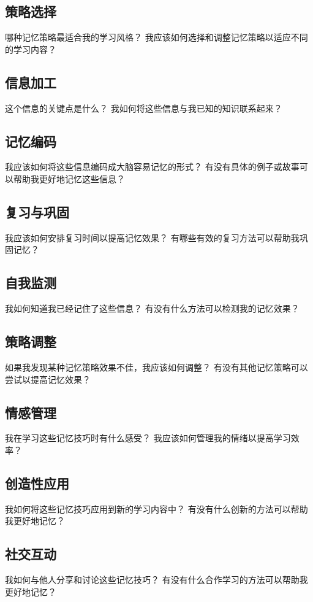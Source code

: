\documentclass[12pt]{book}
\begin{document}
\subsection{策略选择}
哪种记忆策略最适合我的学习风格？
我应该如何选择和调整记忆策略以适应不同的学习内容？

\subsection{信息加工}
这个信息的关键点是什么？
我如何将这些信息与我已知的知识联系起来？

\subsection{记忆编码}
我应该如何将这些信息编码成大脑容易记忆的形式？
有没有具体的例子或故事可以帮助我更好地记忆这些信息？

\subsection{复习与巩固}
我应该如何安排复习时间以提高记忆效果？
有哪些有效的复习方法可以帮助我巩固记忆？

\subsection{自我监测}
我如何知道我已经记住了这些信息？
有没有什么方法可以检测我的记忆效果？

\subsection{策略调整}
如果我发现某种记忆策略效果不佳，我应该如何调整？
有没有其他记忆策略可以尝试以提高记忆效果？

\subsection{情感管理}
我在学习这些记忆技巧时有什么感受？
我应该如何管理我的情绪以提高学习效率？

\subsection{创造性应用}
我如何将这些记忆技巧应用到新的学习内容中？
有没有什么创新的方法可以帮助我更好地记忆？

\subsection{社交互动}
我如何与他人分享和讨论这些记忆技巧？
有没有什么合作学习的方法可以帮助我更好地记忆？
\end{document}
